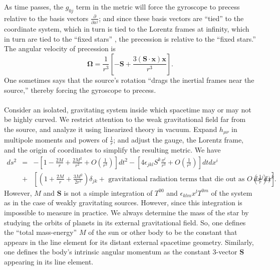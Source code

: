 \documentclass[cyan]{elegantnote}
\begin{document}
As time passes, the $g_{0j}$ term in the metric will force the gyroscope to precess relative to the basis vectors $\frac{\partial}{\partial x^j}$; and since these basis vectors are ``tied'' to the coordinate system, which
in turn is tied to the Lorentz frames at infinity, which in turn are tied to the ``fixed stars'' , the precession is relative to the ``fixed stars.'' 
The angular velocity of precession is
\[\bm{\Omega} = \frac{1}{r^3} \left[ -\bm{S} + \frac{3(\bm{S}\cdot \bm{x})\bm{x}}{r^3} \right] .\]
One sometimes says that the source's rotation ``drags the inertial frames near the source,'' thereby forcing the gyroscope to precess.
\\ \\
Consider an isolated, gravitating system inside which spacetime may or may not be highly curved. We restrict attention to the weak gravitational field far from the source, and analyze it using linearized theory in vacuum.
Expand $h_{\mu\nu}$ in multipole moments and powers of $\frac{1}{r}$; and adjust the gauge, the Lorentz frame, and the origin of coordinates to simplify the resulting metric.
We have
\begin{eqnarray}
ds^2 &=& -\left[1-\frac{2M}{r} + \frac{2M^2}{r^2} + O(\frac{1}{r^3}) \right]dt^2 - \left[4\epsilon_{jkl}S^k \frac{x^l}{r^3} + O(\frac{1}{r^3})  \right] dtdx^i  \nonumber \\
&+& \left[(1+\frac{2M}{r} + \frac{3M^2}{2r^2})\delta_{jk} + \mbox{ gravitational radiation terms that die out as } O(\frac{1}{r}) ) \right]dx^j dx^k. \nonumber
\end{eqnarray}
However, $M$ and $\bm{S}$ is not a simple integration of $T^{00}$ and $\epsilon_{klm} x^l T^{0m}$ of the system as in the case of weakly gravitating sources.
However, since this integration is impossible to measure in practice. We always determine the mass of the star by studying the orbits of planets in its external gravitational field. So, one defines the ``total mass-energy'' $M$ of the sun or other body to be the constant that appears in the line element for its distant external spacetime geometry. Similarly, one defines the body's intrinsic angular momentum as the constant 3-vector $\bm{S}$ appearing in its line element.
\end{document}
